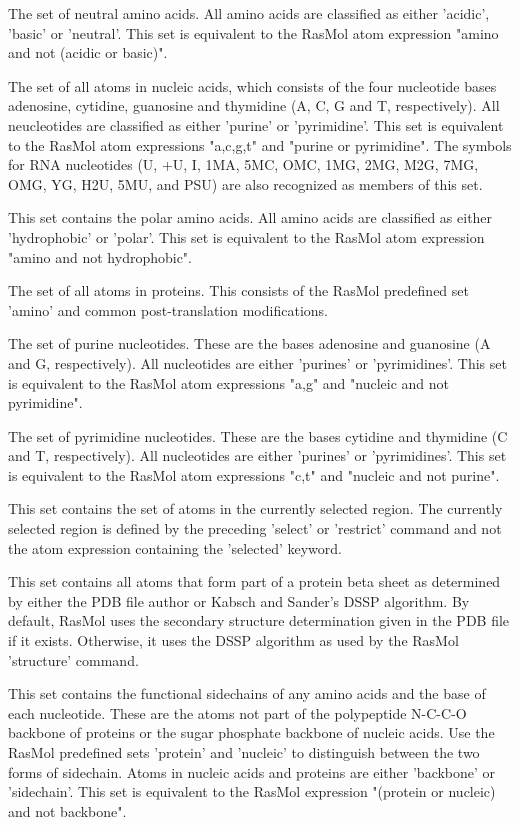 The set of neutral amino acids.
All amino acids are classified as either
'acidic',
'basic'
or
'neutral'.
This set is equivalent to the RasMol atom expression
"amino and not (acidic or basic)".

The set of all atoms in nucleic acids, which consists of the four
nucleotide bases adenosine, cytidine, guanosine and thymidine (A,
C, G and T, respectively). All neucleotides are classified as either
'purine'
or
'pyrimidine'.
This set is equivalent to the RasMol atom expressions
"a,c,g,t"
and
"purine or pyrimidine".
The symbols for RNA nucleotides (U, +U, I, 1MA, 5MC, OMC,
1MG, 2MG, M2G, 7MG, OMG, YG, H2U, 5MU, and PSU) are also
recognized as members of this set.

This set contains the polar amino acids.
All amino acids are classified as either
'hydrophobic'
or
'polar'.
This set is equivalent to the RasMol atom expression
"amino and not hydrophobic".

The set of all atoms in proteins. This consists of the RasMol
predefined set
'amino'
and common post-translation modifications.

The set of purine nucleotides.
These are the bases adenosine and guanosine (A and G, respectively).
All nucleotides are either
'purines'
or
'pyrimidines'.
This set is equivalent to the RasMol atom expressions
"a,g"
and
"nucleic and not pyrimidine".

The set of pyrimidine nucleotides.
These are the bases cytidine and thymidine (C and T, respectively).
All nucleotides are either
'purines'
or
'pyrimidines'.
This set is equivalent to the RasMol atom expressions
"c,t"
and
"nucleic and not purine".

This set contains the set of atoms in the currently selected
region. The currently selected region is defined by the preceding
'select'
or
'restrict'
command and not the atom expression containing the
'selected'
keyword.

This set contains all atoms that form part of a protein beta
sheet as determined by either the PDB file author or Kabsch and
Sander's DSSP algorithm. By default, RasMol uses the secondary
structure determination given in the PDB file if it exists.
Otherwise, it uses the DSSP algorithm as used by the RasMol
'structure'
command.

This set contains the functional sidechains of any amino acids
and the base of each nucleotide. These are the atoms not part of
the polypeptide N-C-C-O backbone of proteins or the sugar
phosphate backbone of nucleic acids.
Use the RasMol predefined sets
'protein'
and
'nucleic'
to distinguish between the two forms of sidechain.
Atoms in nucleic acids and proteins are either
'backbone'
or
'sidechain'.
This set is equivalent to the RasMol expression
"(protein or nucleic) and not backbone".

